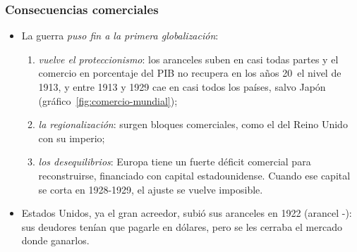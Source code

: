 \documentclass[11pt]{article}
\begin{document}
\begin{anotaciones}
\begin{itemize}
\end{itemize}
\begin{figuracaja}
\caption{Las 4~grandes hiperinflaciones de entreguerras: índices de precios, 1921-1924}\label{fig:hiperinflaciones}
\end{figuracaja}
\begin{imagencaja}
\caption{Niños jugando con fajos de marcos en Alemania, 1923}\label{img:ninos-marcos}
\end{imagencaja}
\end{anotaciones}

\subsubsection{Consecuencias comerciales}

\begin{itemize}
\item La guerra \emph{puso fin a la primera globalización}:
  \begin{enumerate}
  \item \emph{vuelve el proteccionismo}: los aranceles suben en casi todas partes y el comercio en porcentaje del PIB no recupera en los años 20~el nivel de 1913, y entre 1913 y 1929 cae en casi todos los países, salvo Japón (gráfico~\ref{fig:comercio-mundial});
  \item \emph{la regionalización}: surgen bloques comerciales, como el del Reino Unido con su imperio;
  \item \emph{los desequilibrios}: Europa tiene un fuerte déficit comercial para reconstruirse, financiado con capital estadounidense. Cuando ese capital se corta en 1928-1929, el ajuste se vuelve imposible.
  \end{enumerate}
\item Estados Unidos, ya el gran acreedor, subió sus aranceles en 1922 (arancel -): sus deudores tenían que pagarle en dólares, pero se les cerraba el mercado donde ganarlos.
\end{itemize}
\end{document}
